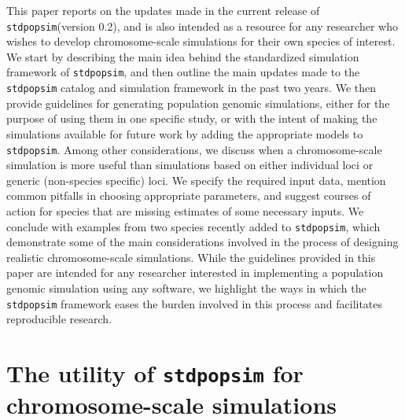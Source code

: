 \documentclass[hidelinks]{article}
\newcommand{\stdpopsim}{\texttt{stdpopsim}\xspace}
\begin{document}
This paper reports on the updates made in the current release of \stdpopsim  (version 0.2),
and is also intended as a resource for any researcher
who wishes to develop chromosome-scale simulations for their own species of interest.
We start by describing the main idea behind the standardized simulation framework
of \stdpopsim,
and then outline the main updates made to the \stdpopsim catalog and simulation framework
in the past two years.
We then provide guidelines for
generating population genomic simulations, either for the purpose of using them in one specific study,
or with the intent of making the simulations available for future work by adding the appropriate models to \stdpopsim.
Among other considerations, we discuss when a chromosome-scale simulation is more useful than
simulations based on either individual loci or generic (non-species specific) loci.
We specify the required input data,
mention common pitfalls in choosing appropriate parameters,
and suggest courses of action for species that are missing estimates of some necessary inputs.
We conclude with examples from two species recently added to \stdpopsim,
which demonstrate some of the main considerations involved in the process of designing realistic chromosome-scale simulations.
While the guidelines provided in this paper are intended for any researcher interested in implementing a population genomic simulation using any software,
we highlight the ways in which the \stdpopsim framework eases the burden involved in this process and facilitates reproducible research.




\section*{The utility of \stdpopsim for chromosome-scale simulations}
    \label{sec:std-sim}
\end{document}
